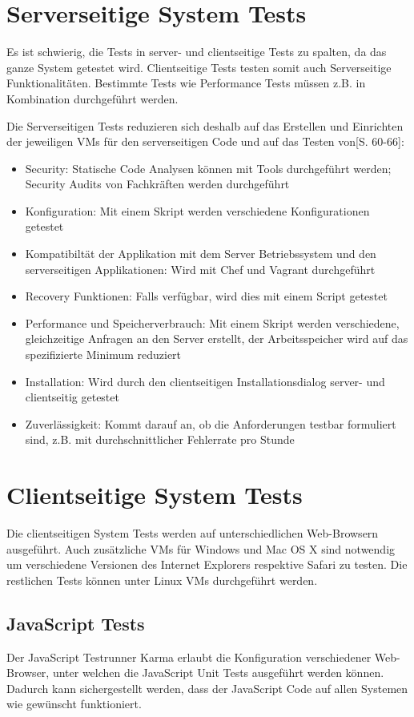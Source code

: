 \documentclass[a4paper,bibtotoc,oneside]{scrbook}
\begin{document}
\section{Serverseitige System Tests}
Es ist schwierig, die Tests in server- und clientseitige Tests zu spalten, da das ganze System getestet wird. Clientseitige Tests testen somit auch Serverseitige Funktionalitäten. Bestimmte Tests wie Performance Tests müssen z.B. in Kombination durchgeführt werden.

Die Serverseitigen Tests reduzieren sich deshalb auf das Erstellen und Einrichten der jeweiligen VMs für den serverseitigen Code und auf das Testen von\cite{test_large_systems}[S. 60-66]:

\begin{itemize}
  \item Security: Statische Code Analysen können mit Tools durchgeführt werden; Security Audits von Fachkräften werden durchgeführt
  \item Konfiguration: Mit einem Skript werden verschiedene Konfigurationen  getestet
  \item Kompatibiltät der Applikation mit dem Server Betriebssystem und den serverseitigen Applikationen: Wird mit Chef und Vagrant durchgeführt
  \item Recovery Funktionen: Falls verfügbar, wird dies mit einem Script getestet
  \item Performance und Speicherverbrauch: Mit einem Skript werden verschiedene, gleichzeitige Anfragen an den Server erstellt, der Arbeitsspeicher wird auf das spezifizierte Minimum reduziert
  \item Installation: Wird durch den clientseitigen Installationsdialog server- und clientseitig getestet
  \item Zuverlässigkeit: Kommt darauf an, ob die Anforderungen testbar formuliert sind, z.B. mit durchschnittlicher Fehlerrate pro Stunde
\end{itemize}

\section{Clientseitige System Tests}
Die clientseitigen System Tests werden auf unterschiedlichen Web-Browsern ausgeführt. Auch zusätzliche VMs für Windows und Mac OS X sind notwendig um verschiedene Versionen des Internet Explorers respektive Safari zu testen. Die restlichen Tests können unter Linux VMs durchgeführt werden.

\subsection{JavaScript Tests}
Der JavaScript Testrunner Karma erlaubt die Konfiguration verschiedener Web-Browser, unter welchen die JavaScript Unit Tests ausgeführt werden können. Dadurch kann sichergestellt werden, dass der JavaScript Code auf allen Systemen wie gewünscht funktioniert.
\end{document}
